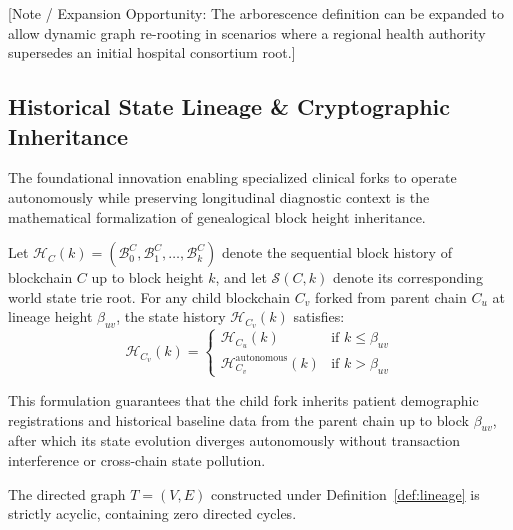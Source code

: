 [Note / Expansion Opportunity: The arborescence definition can be expanded to allow dynamic graph re-rooting in scenarios where a regional health authority supersedes an initial hospital consortium root.]

\subsection{Historical State Lineage & Cryptographic Inheritance}
The foundational innovation enabling specialized clinical forks to operate autonomously while preserving longitudinal diagnostic context is the mathematical formalization of genealogical block height inheritance.

\begin{definition}
\label{def:lineage}
Let $\mathcal{H}_C(k) = (\mathcal{B}_0^C, \mathcal{B}_1^C, \dots, \mathcal{B}_k^C)$ denote the sequential block history of blockchain $C$ up to block height $k$, and let $\mathcal{S}(C, k)$ denote its corresponding world state trie root. For any child blockchain $C_v$ forked from parent chain $C_u$ at lineage height $\beta_{uv}$, the state history $\mathcal{H}_{C_v}(k)$ satisfies:
\begin{equation}
\mathcal{H}_{C_v}(k) = \begin{cases} 
\mathcal{H}_{C_u}(k) & \text{if } k \le \beta_{uv} \\
\mathcal{H}_{C_v}^{\text{autonomous}}(k) & \text{if } k > \beta_{uv}
\end{cases}
\end{equation}
\end{definition}

This formulation guarantees that the child fork inherits patient demographic registrations and historical baseline data from the parent chain up to block $\beta_{uv}$, after which its state evolution diverges autonomously without transaction interference or cross-chain state pollution.

\begin{lemma}
\label{lem:acyclic}
The directed graph $T = (V, E)$ constructed under Definition~\ref{def:lineage} is strictly acyclic, containing zero directed cycles.
\end{lemma}

